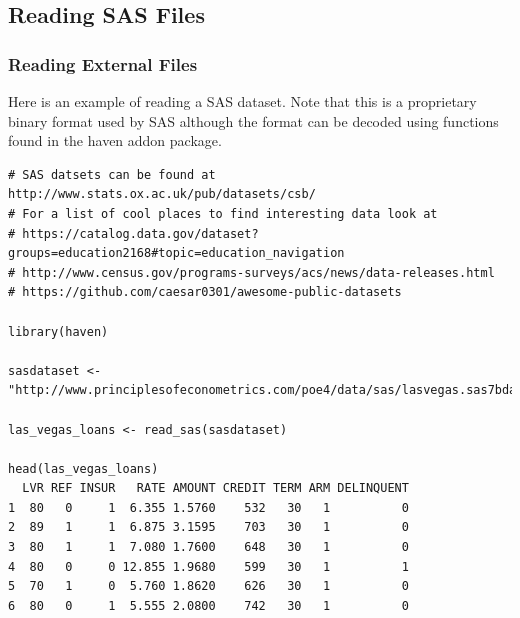 \documentclass{beamer}
\begin{document}
%
\subsection{Reading SAS Files}

\begin{frame}[fragile]
\frametitle{Reading External Files}
Here is an example of reading a SAS dataset. Note that this is a proprietary binary format used
by SAS although the format can be decoded using functions found in the haven addon package. 
\newline
\tiny
\begin{verbatim}
# SAS datsets can be found at http://www.stats.ox.ac.uk/pub/datasets/csb/
# For a list of cool places to find interesting data look at 
# https://catalog.data.gov/dataset?groups=education2168#topic=education_navigation
# http://www.census.gov/programs-surveys/acs/news/data-releases.html
# https://github.com/caesar0301/awesome-public-datasets

library(haven)

sasdataset <- "http://www.principlesofeconometrics.com/poe4/data/sas/lasvegas.sas7bdat"

las_vegas_loans <- read_sas(sasdataset)

head(las_vegas_loans)
  LVR REF INSUR   RATE AMOUNT CREDIT TERM ARM DELINQUENT
1  80   0     1  6.355 1.5760    532   30   1          0
2  89   1     1  6.875 3.1595    703   30   1          0
3  80   1     1  7.080 1.7600    648   30   1          0
4  80   0     0 12.855 1.9680    599   30   1          1
5  70   1     0  5.760 1.8620    626   30   1          0
6  80   0     1  5.555 2.0800    742   30   1          0

\end{verbatim}
\end{frame}
%
\end{document}
